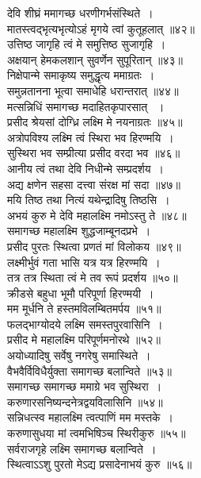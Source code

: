 \documentclass[twoside,top=1.7cm, bottom=1.7cm, outer=1cm,landscape, inner=1.5cm,a5paper,]{book}
\begin{document}
\begin{center}
देवि शीघ्रं ममागच्छ धरणीगर्भसंस्थिते~।\\
मातस्त्वद्भृत्यभृत्योऽहं मृगये त्वां कुतूहलात् ॥४२॥\\[10pt]
उत्तिष्ठ जागृहि त्वं मे समुत्तिष्ठ सुजागृहि~।\\
अक्षयान् हेमकलशान् सुवर्णेन सुपूरितान् ॥४३॥\\[10pt]
निक्षेपान्मे समाकृष्य समुद्धृत्य ममाग्रतः~।\\
समुन्नतानना भूत्वा समाधेहि धरान्तरात् ॥४४॥\\[10pt]
\newpage
मत्सन्निधिं समागच्छ मदाहितकृपारसात् ~।\\
प्रसीद श्रेयसां दोग्ध्रि लक्ष्मि मे नयनाग्रतः ॥४५॥\\[10pt]
अत्रोपविश्य लक्ष्मि त्वं स्थिरा भव हिरण्मयि~।\\
सुस्थिरा भव सम्प्रीत्या प्रसीद वरदा भव ॥४६॥\\[10pt]
 आनीय त्वं  तथा देवि निधीन्मे सम्प्रदर्शय~।\\
अद्य क्षणेन सहसा दत्त्वा संरक्ष मां सदा ॥४७॥\\[10pt]
 मयि तिष्ठ तथा नित्यं यथेन्द्रादिषु तिष्ठसि~।\\
अभयं कुरु मे देवि महालक्ष्मि नमोऽस्तु ते ॥४८॥\\[10pt]
\newpage
समागच्छ महालक्ष्मि शुद्धजाम्बूनदप्रभे~।\\
प्रसीद पुरतः स्थित्वा प्रणतं मां विलोकय ॥४९॥\\[10pt]
लक्ष्मीर्भुवं गता भासि यत्र यत्र हिरण्मयि~।\\
तत्र तत्र स्थिता त्वं मे तव रूपं प्रदर्शय ॥५०॥\\[10pt]
 क्रीडसे बहुधा भूमौ परिपूर्णा हिरण्मयी~।\\
मम मूर्धनि ते हस्तमविलम्बितमर्पय ॥५१॥\\[10pt]
फलद्भाग्योदये लक्ष्मि समस्तपुरवासिनि~।\\
प्रसीद मे महालक्ष्मि परिपूर्णमनोरथे ॥५२॥\\[10pt]
\newpage
अयोध्यादिषु सर्वेषु नगरेषु समास्थिते~।\\
वैभवैर्विविधैर्युक्ता समागच्छ बलान्विते ॥५३॥\\[10pt]
समागच्छ समागच्छ ममाग्रे भव सुस्थिरा~।\\
करुणारसनिष्यन्दनेत्रद्वयविलासिनि ॥५४॥\\[10pt]
सन्निधत्स्व महालक्ष्मि त्वत्पाणिं मम मस्तके~।\\
करुणासुधया मां त्वमभिषिञ्च स्थिरीकुरु ॥५५॥\\[10pt]
सर्वराजगृहे लक्ष्मि समागच्छ बलान्विते~।\\
स्थित्वाऽऽशु पुरतो मेऽद्य प्रसादेनाभयं कुरु ॥५६॥\\[10pt]

\end{center}
\end{document}
